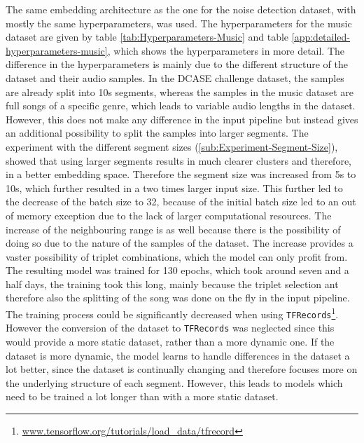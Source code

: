 The same embedding architecture as the one for the noise detection dataset, with mostly the same hyperparameters, was used. The hyperparameters for the music dataset are given by table \ref{tab:Hyperparameters-Music} and table \ref{app:detailed-hyperparameters-music}, which shows the hyperparameters in more detail. The difference in the hyperparameters is mainly due to the different structure of the dataset and their audio samples. In the \gls{DCASE} challenge dataset, the samples are already split into 10s segments, whereas the samples in the music dataset are full songs of a specific genre, which leads to variable audio lengths in the dataset. However, this does not make any difference in the input pipeline but instead gives an additional possibility to split the samples into larger segments. The experiment with the different segment sizes (\ref{sub:Experiment-Segment-Size}), showed that using larger segments results in much clearer clusters and therefore, in a better embedding space. Therefore the segment size was increased from 5s to 10s, which further resulted in a two times larger input size. This further led to the decrease of the batch size to 32, because of the initial batch size led to an out of memory exception due to the lack of larger computational resources. The increase of the neighbouring range is as well because there is the possibility of doing so due to the nature of the samples of the dataset. The increase provides a vaster possibility of triplet combinations, which the model can only profit from.
\newline
\newline
The resulting model was trained for 130 epochs, which took around seven and a half days, the training took this long, mainly because the triplet selection ant therefore also the splitting of the song was done on the fly in the input pipeline. The training process could be significantly decreased when using \texttt{TFRecords}\footnote{\href{https://www.tensorflow.org/tutorials/load\_data/tfrecord\#tfrecord\_files\_using\_tfdata}{www.tensorflow.org/tutorials/load\_data/tfrecord}}. However the conversion of the dataset to \texttt{TFRecords} was neglected since this would provide a more static dataset, rather than a more dynamic one. If the dataset is more dynamic, the model learns to handle differences in the dataset a lot better, since the dataset is continually changing and therefore focuses more on the underlying structure of each segment. However, this leads to models which need to be trained a lot longer than with a more static dataset.
\newline
